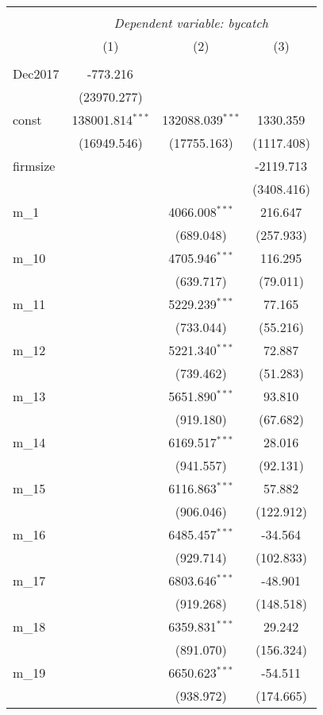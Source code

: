 \begin{table}[!htbp] \centering
\begin{tabular}{@{\extracolsep{5pt}}lccc}
\\[-1.8ex]\hline
\hline \\[-1.8ex]
& \multicolumn{3}{c}{\textit{Dependent variable: bycatch}} \
\cr \cline{2-4}
\\[-1.8ex] & (1) & (2) & (3) \\
\hline \\[-1.8ex]
 Dec2017 & -773.216$^{}$ & & \\
& (23970.277) & & \\
 const & 138001.814$^{***}$ & 132088.039$^{***}$ & 1330.359$^{}$ \\
& (16949.546) & (17755.163) & (1117.408) \\
 firmsize & & & -2119.713$^{}$ \\
& & & (3408.416) \\
 m_1 & & 4066.008$^{***}$ & 216.647$^{}$ \\
& & (689.048) & (257.933) \\
 m_10 & & 4705.946$^{***}$ & 116.295$^{}$ \\
& & (639.717) & (79.011) \\
 m_11 & & 5229.239$^{***}$ & 77.165$^{}$ \\
& & (733.044) & (55.216) \\
 m_12 & & 5221.340$^{***}$ & 72.887$^{}$ \\
& & (739.462) & (51.283) \\
 m_13 & & 5651.890$^{***}$ & 93.810$^{}$ \\
& & (919.180) & (67.682) \\
 m_14 & & 6169.517$^{***}$ & 28.016$^{}$ \\
& & (941.557) & (92.131) \\
 m_15 & & 6116.863$^{***}$ & 57.882$^{}$ \\
& & (906.046) & (122.912) \\
 m_16 & & 6485.457$^{***}$ & -34.564$^{}$ \\
& & (929.714) & (102.833) \\
 m_17 & & 6803.646$^{***}$ & -48.901$^{}$ \\
& & (919.268) & (148.518) \\
 m_18 & & 6359.831$^{***}$ & 29.242$^{}$ \\
& & (891.070) & (156.324) \\
 m_19 & & 6650.623$^{***}$ & -54.511$^{}$ \\
& & (938.972) & (174.665) \\

\end{tabular}
\end{table}
